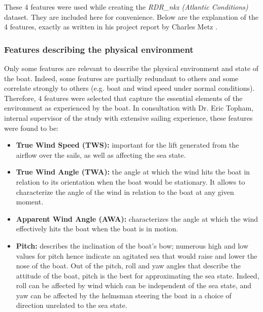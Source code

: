 These 4 features were used while creating the \textit{RDR\_nkz (Atlantic Conditions)} dataset. They are included here for convenience. Below are the explanation of the 4 features, exactly as written in his project report by Charles Metz \cite{charles}.

\subsubsection{Features describing the physical environment} 
Only some features are relevant to describe the physical environment and state of the boat. Indeed, some features are partially redundant to others and some correlate strongly to others (e.g. boat and wind speed under normal conditions). Therefore, 4 features were selected that capture the essential elements of the environment as experienced by the boat. In consultation with Dr. Eric Topham, internal supervisor of the study with extensive sailing experience, these features were found to be: 

\begin{itemize}
    \item \textbf{True Wind Speed (TWS):} important for the lift generated from the airflow over the sails, as well as affecting the sea state.
    \item \textbf{True Wind Angle (TWA):} the angle at which the wind hits the boat in relation to its orientation when the boat would be stationary. It allows to characterize the angle of the wind in relation to the boat at any given moment.
    \item \textbf{Apparent Wind Angle (AWA):} characterizes the angle at which the wind effectively hits the boat when the boat is in motion.
    \item \textbf{Pitch:} describes the inclination of the boat’s bow; numerous high and low values for pitch hence indicate an agitated sea that would raise and lower the nose of the boat. Out of the pitch, roll and yaw angles that describe the attitude of the boat, pitch is the best for approximating the sea state. Indeed, roll can be affected by wind which can be independent of the sea state, and yaw can be affected by the helmsman steering the boat in a choice of direction unrelated to the sea state.
\end{itemize}